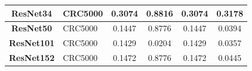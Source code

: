 \begin{table}[t!]
\begin{tabular}{|c|l|c|c|c|c|}
\textbf{ResNet34}    & CRC5000                                   & 0.3074        & 0.8816              & 0.3074           & 0.3178             \\ \hline
\textbf{ResNet50}    & CRC5000                                   & 0.1447        & 0.8776              & 0.1447           & 0.0394             \\ \hline
\textbf{ResNet101}    & CRC5000                                  & 0.1429        & 0.0204              & 0.1429           & 0.0357             \\ \hline
\textbf{ResNet152}    & CRC5000                                  & 0.1472        & 0.8776              & 0.1472           & 0.0445             \\ \hline
\end{tabular}

\end{table}


